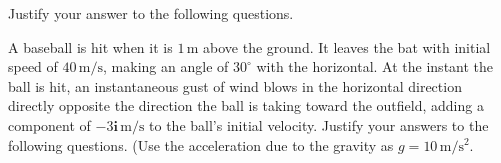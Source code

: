 \documentclass[]{gshs_exam_S}
\begin{document}
\begin{multicols*}{2}
\begin{questions}\extrawidth{8.1em}\setcounter{question}{2} %

\addpoints
\question Justify your answer to the following questions.\droptotalpoints
\vspace{2em}

\vspace*{\fill}
\columnbreak

\addpoints
\question A baseball is hit when it is $1\,\mathrm{m}$ above the ground. It leaves the bat with initial speed of $40\,\mathrm{m/s}$, making an angle of $30^\circ$ with the horizontal. At the instant the ball is hit, an instantaneous gust of wind blows in the horizontal direction directly opposite the direction the ball is taking toward the outfield, adding a component of $-3\mathbf{i}\,\mathrm{m/s}$ to the ball's initial velocity. Justify your answers to the following questions. (Use the acceleration due to the gravity as $g=10\,\mathrm{m/s^2}$.\par\droptotalpoints
\vspace{2em}
\end{questions}
\end{multicols*}
\end{document}
